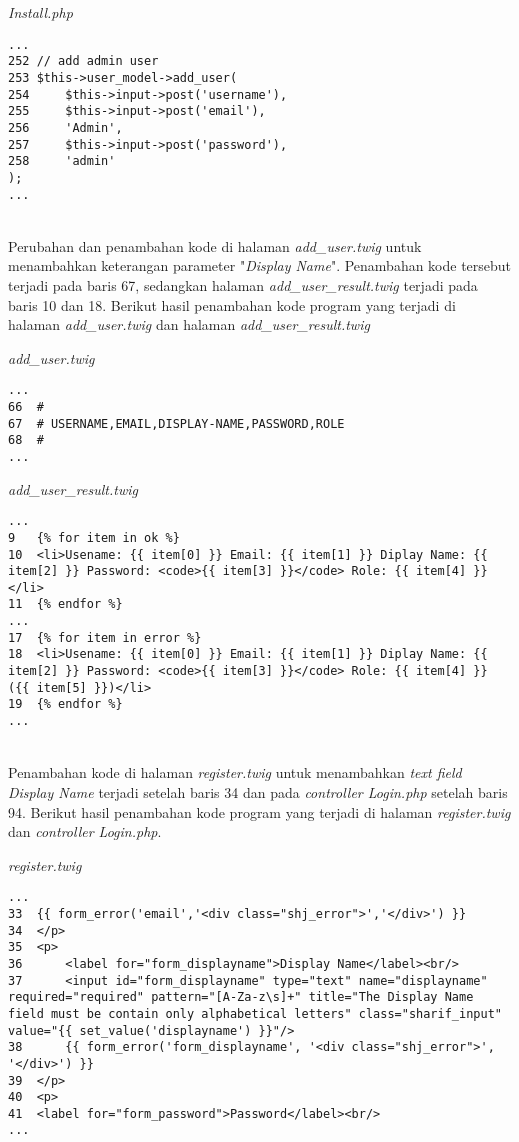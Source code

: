 \textit{Install.php}
\begin{lstlisting}[basicstyle=\ttfamily, frame=single,
columns=fullflexible, keepspaces=true, breaklines=true]
...
252	// add admin user
253	$this->user_model->add_user(
254		$this->input->post('username'),
255		$this->input->post('email'),
256		'Admin',
257		$this->input->post('password'),
258		'admin'
);
...
\end{lstlisting}
~\\ 
Perubahan dan penambahan kode di halaman \textit{add\_user.twig} untuk menambahkan keterangan parameter "\textit{Display Name}". Penambahan kode tersebut terjadi pada baris 67, sedangkan halaman \textit{add\_user\_result.twig} terjadi pada baris 10 dan 18. Berikut hasil penambahan kode program yang terjadi di halaman \textit{add\_user.twig} dan halaman \textit{add\_user\_result.twig}

\textit{add\_user.twig}
\begin{lstlisting}[basicstyle=\ttfamily, frame=single,
columns=fullflexible, keepspaces=true, breaklines=true]
...
66	#
67	# USERNAME,EMAIL,DISPLAY-NAME,PASSWORD,ROLE
68	#
...
\end{lstlisting}

\textit{add\_user\_result.twig}
\begin{lstlisting}[basicstyle=\ttfamily, frame=single,
columns=fullflexible, keepspaces=true, breaklines=true]
...
9	{% for item in ok %}
10	<li>Usename: {{ item[0] }} Email: {{ item[1] }} Diplay Name: {{ item[2] }} Password: <code>{{ item[3] }}</code> Role: {{ item[4] }} </li>
11	{% endfor %}
...
17	{% for item in error %}
18	<li>Usename: {{ item[0] }} Email: {{ item[1] }} Diplay Name: {{ item[2] }} Password: <code>{{ item[3] }}</code> Role: {{ item[4] }} ({{ item[5] }})</li>
19	{% endfor %}
...
\end{lstlisting}
~\\
Penambahan kode di halaman \textit{register.twig} untuk menambahkan \textit{text field Display Name} terjadi setelah baris 34 dan pada \textit{controller Login.php} setelah baris 94. Berikut hasil penambahan kode program yang terjadi di halaman \textit{register.twig} dan \textit{controller Login.php}.

\textit{register.twig}
\begin{lstlisting}[basicstyle=\ttfamily, frame=single,
columns=fullflexible, keepspaces=true, breaklines=true]
...
33	{{ form_error('email','<div class="shj_error">','</div>') }}
34	</p>
35	<p>
36		<label for="form_displayname">Display Name</label><br/>
37		<input id="form_displayname" type="text" name="displayname" required="required" pattern="[A-Za-z\s]+" title="The Display Name field must be contain only alphabetical letters" class="sharif_input" value="{{ set_value('displayname') }}"/>
38		{{ form_error('form_displayname', '<div class="shj_error">', '</div>') }}
39	</p>
40	<p>
41	<label for="form_password">Password</label><br/>
...
\end{lstlisting}

